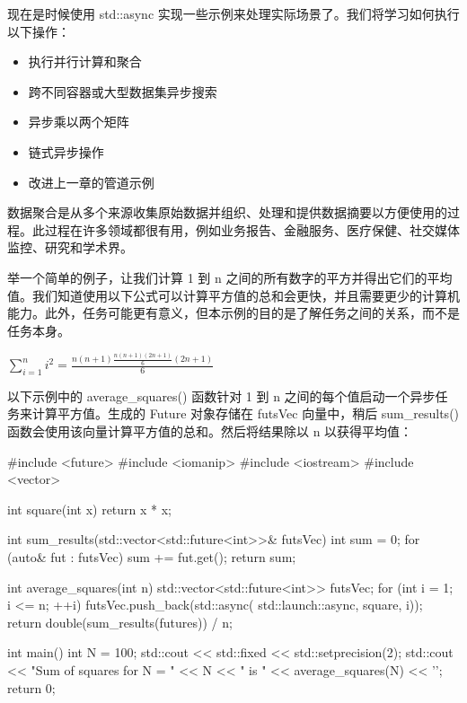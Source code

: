 现在是时候使用 std::async 实现一些示例来处理实际场景了。我们将学习如何执行以下操作：

\begin{itemize}
\item
执行并行计算和聚合

\item
跨不同容器或大型数据集异步搜索

\item
异步乘以两个矩阵

\item
链式异步操作

\item
改进上一章的管道示例
\end{itemize}


数据聚合是从多个来源收集原始数据并组织、处理和提供数据摘要以方便使用的过程。此过程在许多领域都很有用，例如业务报告、金融服务、医疗保健、社交媒体监控、研究和学术界。

举一个简单的例子，让我们计算 1 到 n 之间的所有数字的平方并得出它们的平均值。我们知道使用以下公式可以计算平方值的总和会更快，并且需要更少的计算机能力。此外，任务可能更有意义，但本示例的目的是了解任务之间的关系，而不是任务本身。

\begin{center}
$\sum_{i=1}^{n}{i^2} = \frac{n(n+1)\frac{n(n+1)(2n+1)}{6}(2n+1)}{6}$
\end{center}

以下示例中的 average\_squares() 函数针对 1 到 n 之间的每个值启动一个异步任务来计算平方值。生成的 Future 对象存储在 futsVec 向量中，稍后 sum\_results() 函数会使用该向量计算平方值的总和。然后将结果除以 n 以获得平均值：

\begin{cpp}
#include <future>
#include <iomanip>
#include <iostream>
#include <vector>

int square(int x) {
    return x * x;
}

int sum_results(std::vector<std::future<int>>& futsVec) {
    int sum = 0;
    for (auto& fut : futsVec) {
        sum += fut.get();
    }
    return sum;
}

int average_squares(int n) {
    std::vector<std::future<int>> futsVec;
    for (int i = 1; i <= n; ++i) {
        futsVec.push_back(std::async(
        std::launch::async, square, i));
    }
    return double(sum_results(futures)) / n;
}

int main() {
    int N = 100;
    std::cout << std::fixed << std::setprecision(2);
    std::cout << "Sum of squares for N = " << N
              << " is " << average_squares(N) << '\n';
    return 0;
}
\end{cpp}

